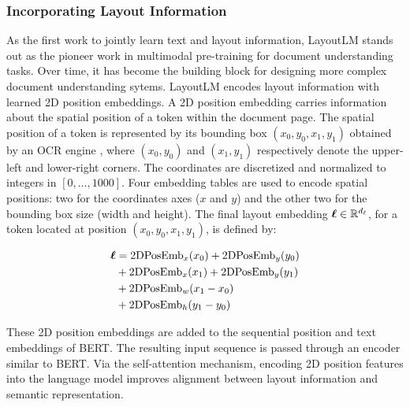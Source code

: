 \subsubsection{Incorporating Layout Information} 

As the first work to jointly learn text and layout information, LayoutLM \citep{xu2020layoutlm} stands out as the pioneer work in multimodal pre-training for document understanding tasks. Over time, it has become the building block for designing more complex document understanding sytems. LayoutLM encodes layout information with learned 2D position embeddings. A 2D position embedding carries information about the spatial position of a token within the document page. The spatial position of a token is represented by its bounding box $(x_0, y_0, x_1, y_1)$ obtained by an \ac{OCR} engine \citep{kay2007tesseract}, where $(x_0, y_0)$ and $(x_1, y_1)$ respectively denote the upper-left and lower-right corners. The coordinates are discretized and normalized to integers in $[0, \ldots, 1000]$. Four embedding tables are used to encode spatial positions: two for the coordinates axes ($x$ and $y$) and the other two for the bounding box size (width and height). The final layout embedding $\boldsymbol{\ell} \in \mathbb{R}^{d_{\ell}}$, for a token located at position $(x_0, y_0, x_1, y_1)$, is defined by:

\begin{equation}
\begin{split}
    \boldsymbol{\ell} & = \text{2DPosEmb}_x(x_0) + \text{2DPosEmb}_y(y_0) \\
    & + \text{2DPosEmb}_x(x_1) + \text{2DPosEmb}_y(y_1) \\
    & + \text{2DPosEmb}_w(x_1 - x_0) \\
    & + \text{2DPosEmb}_h(y_1 - y_0) \\
\end{split}
\end{equation}

\noindent These 2D position embeddings are added to the sequential position and text embeddings of \ac{BERT}. The resulting input sequence is passed through an encoder similar to \ac{BERT}. Via the self-attention mechanism, encoding 2D position features into the language model improves alignment between layout information and semantic representation. 

